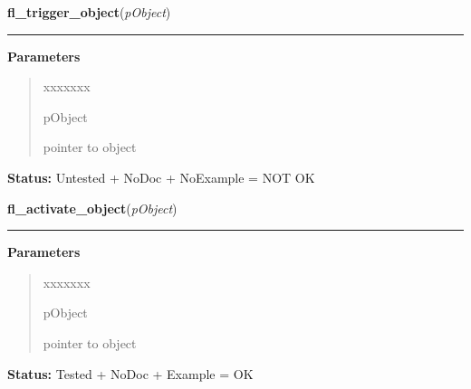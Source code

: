 \hspace{.8\funcindent}\begin{boxedminipage}{\funcwidth}

    \raggedright \textbf{fl\_trigger\_object}(\textit{pObject})

    \vspace{-1.5ex}

    \rule{\textwidth}{0.5\fboxrule}
\setlength{\parskip}{2ex}
\setlength{\parskip}{1ex}
      \textbf{Parameters}
      \vspace{-1ex}

      \begin{quote}
        \begin{Ventry}{xxxxxxx}

          \item[pObject]

          pointer to object

        \end{Ventry}

      \end{quote}

\textbf{Status:} Untested + NoDoc + NoExample = NOT OK



    \end{boxedminipage}

    \label{xformslib:library:fl_activate_object}

    \vspace{0.5ex}

\hspace{.8\funcindent}\begin{boxedminipage}{\funcwidth}

    \raggedright \textbf{fl\_activate\_object}(\textit{pObject})

    \vspace{-1.5ex}

    \rule{\textwidth}{0.5\fboxrule}
\setlength{\parskip}{2ex}
\setlength{\parskip}{1ex}
      \textbf{Parameters}
      \vspace{-1ex}

      \begin{quote}
        \begin{Ventry}{xxxxxxx}

          \item[pObject]

          pointer to object

        \end{Ventry}

      \end{quote}

\textbf{Status:} Tested + NoDoc + Example = OK



    \end{boxedminipage}

